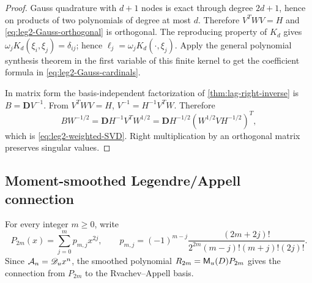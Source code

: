 \begin{proof}
Gauss quadrature with $d+1$ nodes is exact through degree $2d+1$, hence on
products of two polynomials of degree at most $d$.  Therefore $V^TWV=H$ and
\eqref{eq:leg2-Gauss-orthogonal} is orthogonal.  The reproducing
property of $K_d$ gives
$\omega_jK_d(\xi_i,\xi_j)=\delta_{ij}$; hence
$\ell_j=\omega_jK_d(\cdot,\xi_j)$.  Apply the general polynomial synthesis
theorem in the first variable of this finite kernel to get the coefficient
formula in \eqref{eq:leg2-Gauss-cardinals}.

In matrix form the basis-independent factorization of
\cref{thm:lag-right-inverse} is $B=\mathbf D V^{-1}$.  From $V^TWV=H$,
$V^{-1}=H^{-1}V^TW$.  Therefore
\[
 BW^{-1/2}=\mathbf D H^{-1}V^TW^{1/2}
 =\mathbf D H^{-1/2}(W^{1/2}VH^{-1/2})^T,
\]
which is \eqref{eq:leg2-weighted-SVD}.  Right multiplication by an orthogonal
matrix preserves singular values.
\end{proof}

\subsection{Moment-smoothed Legendre/Appell connection}
\label{sec:leg-smoothed}

For every integer $m\ge0$, write
\begin{equation}
 P_{2m}(x)=\sum_{j=0}^{m}p_{m,j}x^{2j},
 \qquad
 p_{m,j}=(-1)^{m-j}
 \frac{(2m+2j)!}
 {2^{2m}(m-j)!(m+j)!(2j)!}.
 \label{eq:leg2-legendre-monomial}
\end{equation}
Since $\mathcal A_n=\mathscr D_ux^n$, the smoothed polynomial
$R_{2m}=\mathsf M_u(D)P_{2m}$ gives the connection from $P_{2m}$ to the
Rvachev--Appell basis.

